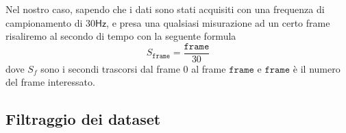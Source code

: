 Nel nostro caso, sapendo che i dati sono stati acquisiti con una frequenza di campionamento di 
$30\mathsf{Hz}$, e presa una qualsiasi misurazione ad un certo frame risaliremo al secondo
di tempo con la seguente formula
\[ S_\texttt{frame} = \frac{\texttt{frame}}{30} \]
dove $S_f$ sono i secondi trascorsi dal frame $0$ al frame $\texttt{frame}$ e $\texttt{frame}$ 
è il numero del frame interessato.


\subsection{Filtraggio dei dataset}
